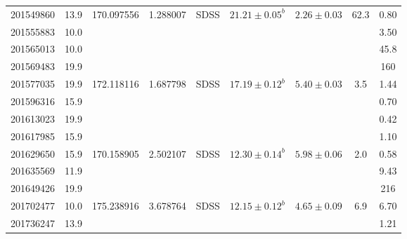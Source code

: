 \begin{landscape}
\begin{table}[hbt!]
\begin{center}
\begin{tabular}{lcccccccc}
 201549860  & 13.9 & 170.097556 &  1.288007    & SDSS    &    $21.21 \pm 0.05^b$ & $2.26 \pm 0.03$ & 62.3 & 0.80 \\
 201555883  & 10.0 &                 &                       &                &                                                           &                          &              & 3.50 \\
 201565013  & 10.0 &               &                       &                &                                                           &                          &                & 45.8    \\
 201569483  & 19.9 &                 &                       &                &                                                           &                          &              & 160  \\
 201577035  & 19.9 & 172.118116 &  1.687798    & SDSS    &  $17.19 \pm 0.12^b$  & $5.40 \pm 0.03$ & 3.5    & 1.44  \\
 201596316  & 15.9 &                 &                       &                &                                                           &                          &              & 0.70 \\
 201613023  & 19.9 &                 &                       &                &                                                           &                          &              & 0.42 \\
 201617985  & 15.9 &                 &                       &                &                                                           &                          &             & 1.10  \\
 201629650  & 15.9 & 170.158905 &  2.502107   & SDSS     & $12.30 \pm 0.14^b$ &   $5.98 \pm 0.06$ & 2.0   & 0.58 \\
 201635569  & 11.9 &                  &                       &                &                                                           &                          &            & 9.43 \\
 201649426  & 19.9 &                 &                       &                &                                                           &                          &             & 216   \\
 201702477  & 10.0 & 175.238916 &  3.678764    & SDSS     &  $12.15 \pm 0.12^b$ & $4.65 \pm 0.09$ & 6.9   & 6.70 \\
 201736247  & 13.9 &                  &                       &                &                                                           &                          &            & 1.21 \\

\end{tabular}
\end{center}
\end{table}
\end{landscape}
